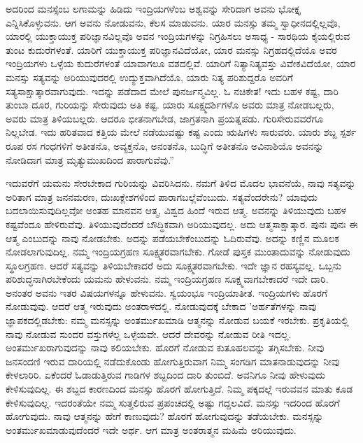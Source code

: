 ಅದರಿಂದ ಮನಸ್ಸೆಂಬ ಲಗಾಮನ್ನು ಹಿಡಿದು ಇಂದ್ರಿಯಗಳೆಂಬ ಅಶ್ವವನ್ನು ಸೇರಿದಾಗ ಅವನು ಭೋಕ್ತೃ ಎನ್ನಿಸಿಕೊಳ್ಳುವನು. ಆಗ ಅವನು ನೋಡುವನು, ಕೆಲಸ ಮಾಡುವನು. ಯಾರ ಮನಸ್ಸು ತಮ್ಮ ಸ್ವಾಧೀನದಲ್ಲಿಲ್ಲವೊ, ಯಾರಲ್ಲಿ ಯುಕ್ತಾಯುಕ್ತ ಪರಿಜ್ಞಾನವಿಲ್ಲವೊ ಅವನ ಇಂದ್ರಿಯಗಳನ್ನು ನಿಗ್ರಹಿಸಲು ಅಸಾಧ್ಯ - ಸಾರಥಿಯ ಕೈಯಲ್ಲಿರುವ ತುಂಟ ಕುದುರೆಗಳಂತೆ. ಯಾರಿಗೆ ಯುಕ್ತಾಯುಕ್ತ ಪರಿಜ್ಞಾನವಿದೆಯೋ, ಯಾರ ಮನಸ್ಸು ನಿಗ್ರಹದಲ್ಲಿದೆಯೊ ಅವರ ಇಂದ್ರಿಯಗಳು ಒಳ್ಳೆಯ ಕುದುರೆಗಳಂತೆ ಯಾವಾಗಲೂ ವಶದಲ್ಲಿವೆ. ಯಾರಿಗೆ ನಿತ್ಯಾನಿತ್ಯವಸ್ತು ವಿವೇಕವಿದೆಯೋ, ಯಾರ ಮನಸ್ಸು ಸತ್ಯವನ್ನು ಅರಿಯುವುದರಲ್ಲಿ ಉದ್ಯುಕ್ತವಾಗಿದೆಯೊ, ಯಾರು ನಿತ್ಯ ಪರಿಶುದ್ದರೊ ಅವರಿಗೆ ಸತ್ಯಸಾಕ್ಷಾತ್ಕಾರವಾಗುವುದು. ಇದನ್ನು ಪಡೆದಾದ ಮೇಲೆ ಪುನರ್ಜನ್ಮವಿಲ್ಲ. ಓ ನಚಿಕೇತ! ಇದು ಬಹಳ ಕಷ್ಟ, ದಾರಿ ತುಂಬಾ ದೂರ, ಗುರಿಯನ್ನು ಸೇರುವುದು ಅತಿ ಕಷ್ಟ. ಯಾರು ಸೂಕ್ಷ್ಮದರ್ಶಿಗಳೊ ಅವರು ಮಾತ್ರ ನೋಡಬಲ್ಲರು, ಅವರು ಮಾತ್ರ ತಿಳಿಯಬಲ್ಲರು. ಆದರೂ ಭೀತನಾಗಬೇಡ, ಜಾಗ್ರತನಾಗಿ ಪ್ರಯತ್ನಪಡು. ಗುರಿಸೇರುವವರೆಗೂ ನಿಲ್ಲಬೇಡ. ಇದು ಹರಿತವಾದ ಕತ್ತಿಯ ಮೇಲೆ ನಡೆಯುವಷ್ಟು ಕಷ್ಟ ಎಂದು ಋಷಿಗಳು ಸಾರುವರು. ಯಾರು ಶಬ್ದ ಸ್ಪರ್ಶ ರೂಪ ರಸ ಗಂಧಗಳಿಗೆ ಅತೀತನೊ, ಅವ್ಯಕ್ತನೊ, ಅನಂತನೊ, ಬುದ್ಧಿಗೆ ಅತೀತನೊ ಅವಿನಾಶಿಯೊ ಅವನನ್ನು ನೋಡಿದಾಗ ಮಾತ್ರ ಮೃತ್ಯುಮುಖದಿಂದ ಪಾರಾಗುವೆವು.”

ಇದುವರೆಗೆ ಯಮನು ಸೇರಬೇಕಾದ ಗುರಿಯನ್ನು ವಿವರಿಸಿದನು. ನಮಗೆ ತಿಳಿದ ಮೊದಲ ಭಾವನೆಯೆ, ನಾವು ಸತ್ಯವನ್ನು ಅರಿತಾಗ ಮಾತ್ರ ಜನನಮರಣ, ದುಃಖಕ್ಲೇಶಗಳಿಂದ ಪಾರಾಗಬಲ್ಲೆವೆಂಬುದು. ಸತ್ಯವೆಂದರೇನು? ಯಾವುದು ಬದಲಾಯಿಸುವುದಿಲ್ಲವೋ ಅಂತಹ ಮಾನವನ ಆತ್ಮ, ವಿಶ್ವದ ಹಿಂದೆ ಇರುವ ಆತ್ಮ. ಅವನನ್ನು ತಿಳಿಯುವುದು ಬಹಳ ಕಷ್ಟವೆಂದೂ ಹೇಳಿರುವೆವು. ತಿಳಿಯುವುದೆಂದರೆ ಬೌದ್ಧಿಕವಾಗಿ ಅರಿಯುವುದಲ್ಲ. ಅದು ಆತ್ಮಸಾಕ್ಷಾತ್ಕಾರ. ಪುನಃ ಪುನಃ ಈ ಆತ್ಮ ಎಂಬುದನ್ನು ನಾವು ನೋಡಬೇಕು. ಅದನ್ನು ಪಡೆಯಬೇಕೆಂಬುದನ್ನು ಓದಿರುವೆವು. ಅದನ್ನು ಕಣ್ಣಿನ ಮೂಲಕ ನೋಡಲಾಗುವುದಿಲ್ಲ. ನಮ್ಮ ಇಂದ್ರಿಯಗ್ರಹಣ ಸೂಕ್ಷ್ಮತರವಾಗಬೇಕು. ಗೋಡೆ ಪುಸ್ತಕ ಮುಂತಾದುವನ್ನು ನೋಡುವುದು ಸ್ಥೂಲಗ್ರಹಣ. ಆದರೆ ಸತ್ಯವನ್ನು ತಿಳಿಯಬೇಕಾದರೆ ಅದು ಸೂಕ್ಷ್ಮತರವಾಗಬೇಕು. ಇದೇ ಜ್ಞಾನ ರಹಸ್ಯವಲ್ಲ. ಒಬ್ಬನು ಪರಿಶುದ್ಧನಾಗಿರಬೇಕೆಂದು ಯಮನು ಹೇಳುವನು. ನಮ್ಮ ಇಂದ್ರಿಯಗ್ರಹಣ ಸೂಕ್ಷ್ಮವಾಗಬೇಕಾದರೆ ಇದೇ ದಾರಿ. ಅನಂತರ ಅವನು ಇತರ ವಿಷಯಗಳನ್ನೂ ಹೇಳುವನು. ಸ್ವಯಂಭೂ ಇಂದ್ರಿಯಾತೀತ. ಇಂದ್ರಿಯಗಳು ಹೊರಗೆ ನೋಡುವುವು. ಆದರೆ ಆತ್ಮ ಇರುವುದು ಅಂತರಾಳದಲ್ಲಿ. ನೋಡುವುದಕ್ಕೆ ಬೇಕಾದ 'ಅರ್ಹತೆಗಳನ್ನು ನಾವು ಜ್ಞಾಪಕದಲ್ಲಿಡಬೇಕು: ನಮ್ಮ ಮನಸ್ಸನ್ನು ಅಂತರ್ಮುಖಮಾಡಿ ಆತ್ಮನನ್ನು ನೋಡುವ ಬಯಕೆ ಇರಬೇಕು. ಪ್ರಕೃತಿಯಲ್ಲಿ ನಾವು ನೋಡುವ ಸುಂದರ ವಸ್ತುಗಳೆಲ್ಲ ಒಳ್ಳೆಯವೇ. ಆದರೆ ದೇವರನ್ನು ನೋಡುವ ರೀತಿ ಇದಲ್ಲ. ಅಂತರ್ಮುಖರಾಗುವುದನ್ನು ನಾವು ಕಲಿಯಬೇಕು. ಹೊರಗೆ ನೋಡುವ ಕುತೂಹಲವನ್ನು ತಗ್ಗಿಸಬೇಕು. ನೀವು ಜನಸಂದಣಿ ಇರುವ ದಾರಿಯಲ್ಲಿ ನಡೆದುಕೊಂಡು ಹೋಗುತ್ತಿರುವಾಗ ನಿಮ್ಮ ಸಂಗಡಿಗ ಮಾತನಾಡುವುದನ್ನು ನೀವು ಕೇಳಲಾರಿರಿ. ಏಕೆಂದರೆ ಓಡಾಡುತ್ತಿರುವ ಗಾಡಿಗಳ ಶಬ್ದದಿಂದ ದಾರಿ ತುಂಬಿದೆ. ಅವನಿಗೂ ನೀವು ಹೇಳುವುದು ಕೇಳಿಸುವುದಿಲ್ಲ. ಈ ಶಬ್ದದ ಕಾರಣದಿಂದ ಮನಸ್ಸು ಹೊರಗೆ ಹೋಗುತ್ತಿದೆ. ನಿಮ್ಮ ಪಕ್ಕದಲ್ಲೆ ಇರುವವನ ಮಾತು ಕೂಡ ಕೇಳಿಸುವುದಿಲ್ಲ. ಇದರಂತೆಯೇ ನಮ್ಮ ಸುತ್ತಲಿರುವ ಪ್ರಪಂಚದಲ್ಲಿ ಅಷ್ಟು ಗದ್ದಲವಿದೆ. ಮನಸ್ಸು ಇದರಿಂದ ಹೊರಗೆ ಹೋಗುವುದು. ನಾವು ಆತ್ಮನನ್ನು ಹೇಗೆ ಕಾಣುವುದು? ಹೊರಗೆ ಹೋಗುವುದನ್ನು ತಡೆಯಬೇಕು. ಮನಸ್ಸನ್ನು ಅಂತರ್ಮುಖಮಾಡುವುದೆಂದರೆ ಇದೇ ಅರ್ಥ. ಆಗ ಮಾತ್ರ ಅಂತರಾತ್ಮನ ಮಹಿಮೆ ಅರಿಯುವುದು.

